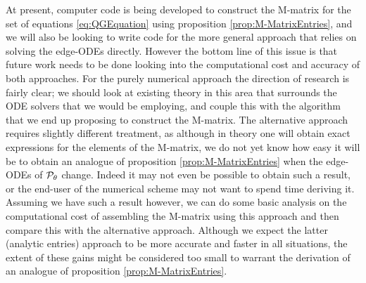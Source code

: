 At present, computer code is being developed to construct the M-matrix for the set of equations \eqref{eq:QGEquation} using proposition \ref{prop:M-MatrixEntries}, and we will also be looking to write code for the more general approach that relies on solving the edge-ODEs directly.
However the bottom line of this issue is that future work needs to be done looking into the computational cost and accuracy of both approaches.
For the purely numerical approach the direction of research is fairly clear; we should look at existing theory in this area that surrounds the ODE solvers that we would be employing, and couple this with the algorithm that we end up proposing to construct the M-matrix.
The alternative approach requires slightly different treatment, as although in theory one will obtain exact expressions for the elements of the M-matrix, we do not yet know how easy it will be to obtain an analogue of proposition \ref{prop:M-MatrixEntries} when the edge-ODEs of $\mathcal{P}_{\theta}$ change.
Indeed it may not even be possible to obtain such a result, or the end-user of the numerical scheme may not want to spend time deriving it.
Assuming we have such a result however, we can do some basic analysis on the computational cost of assembling the M-matrix using this approach and then compare this with the alternative approach.
Although we expect the latter (analytic entries) approach to be more accurate and faster in all situations, the extent of these gains might be considered too small to warrant the derivation of an analogue of proposition \ref{prop:M-MatrixEntries}.

